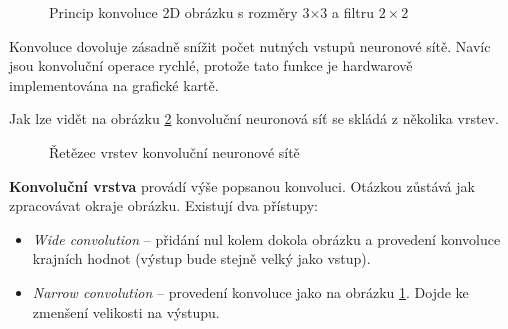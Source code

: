 \begin{figure}[H]
  \begin{center}
  \label{obrazek:principkonvoluce}
  \caption{Princip konvoluce 2D obrázku s rozměry 3$\times$3 a filtru $2\times2$}
  \end{center}
\end{figure}

Konvoluce dovoluje zásadně snížit počet nutných vstupů neuronové sítě. Navíc jsou konvoluční operace rychlé, protože tato funkce je hardwarově implementována na grafické kartě.

Jak lze vidět na obrázku \ref{obrazek:cnnpipeline} konvoluční neuronová síť se skládá z několika vrstev.

\begin{figure}[H]
  \begin{center}
  \label{obrazek:cnnpipeline}
  \caption{Řetězec vrstev konvoluční neuronové sítě \cite{cnnNlp}}
  \end{center}
\end{figure}

\textbf{Konvoluční vrstva} provádí výše popsanou konvoluci. Otázkou zůstává jak zpracovávat okraje obrázku. Existují dva přístupy:

\begin{itemize}
  \item \emph{Wide convolution} -- přidání nul kolem dokola obrázku a provedení konvoluce krajních hodnot (výstup bude stejně velký jako vstup).
  \item \emph{Narrow convolution} -- provedení konvoluce jako na obrázku \ref{obrazek:principkonvoluce}. Dojde ke zmenšení velikosti na výstupu.
\end{itemize}

